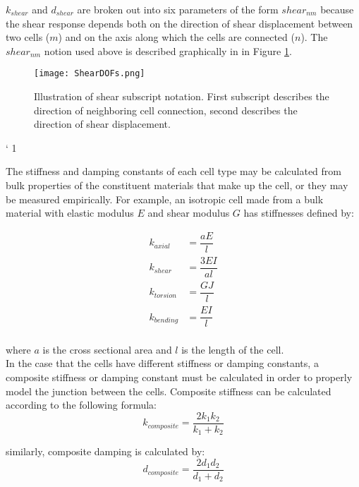 {$k_{shear}$ and $d_{shear}$ are broken out into six parameters of the form $shear_{nm}$ because the shear response depends both on the direction of shear displacement between two cells ($m$) and on the axis along which the cells are connected ($n$).  The $shear_{nm}$ notion used above is described graphically in in Figure \ref{fig:ShearDOFs}.\\

\begin{figure}
  \texttt{[image: ShearDOFs.png]}
  \caption{Illustration of shear subscript notation.  First subscript describes the direction of neighboring cell connection, second describes the direction of shear displacement.}
  \label{fig:ShearDOFs}
\end{figure}`	1

The stiffness and damping constants of each cell type may be calculated from bulk properties of the constituent materials that make up the cell, or they may be measured empirically.  For example, an isotropic cell made from a bulk material with elastic modulus $E$ and shear modulus $G$ has stiffnesses defined by:

\begin{subequations}
\begin{align} 
\label{eq:kaxial}
k_{axial} &= \dfrac{aE}{l}\\[10pt]
\label{eq:kshear}
k_{shear} &= \dfrac{3EI}{al}\\[10pt]
\label{eq:ktorsion}
k_{torsion} &= \dfrac{GJ}{l}\\[10pt]
\label{eq:kbending}
k_{bending} &= \dfrac{EI}{l}
\end{align}
\end{subequations}
\\
where $a$ is the cross sectional area and $l$ is the length of the cell.\\

 In the case that the cells have different stiffness or damping constants, a composite stiffness or damping constant must be calculated in order to properly model the junction between the cells.  Composite stiffness can be calculated according to the following formula:
 \begin{equation} \label{eq:springseries}
 k_{composite} = \dfrac{2k_1k_2}{k_1+k_2}
 \end{equation}

similarly, composite damping is calculated by:
 \begin{equation} \label{eq:damperseries}
d_{composite} = \dfrac{2d_1d_2}{d_1+d_2}
 \end{equation}
 
}
